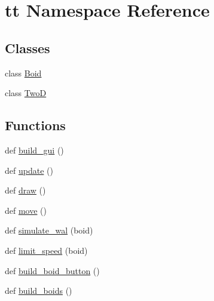 \hypertarget{namespacett}{}\section{tt Namespace Reference}
\label{namespacett}
\subsection*{Classes}
\begin{DoxyCompactItemize}
\item 
class \hyperlink{classtt_1_1_boid}{Boid}
\item 
class \hyperlink{classtt_1_1_two_d}{TwoD}
\end{DoxyCompactItemize}
\subsection*{Functions}
\begin{DoxyCompactItemize}
\item 
def \hyperlink{namespacett_a4d08caf13001a675cd82fe7c4438d657}{build\+\_\+gui} ()
\item 
def \hyperlink{namespacett_a7bdfd42cb1d13da52111a5be9b2d255b}{update} ()
\item 
def \hyperlink{namespacett_aa69d28bb0985169625e0b9162f4b1282}{draw} ()
\item 
def \hyperlink{namespacett_a958094ad0575c8ccce295d919f0a52ff}{move} ()
\item 
def \hyperlink{namespacett_a67daab86030bfe298b96882772167b9d}{simulate\+\_\+wal} (boid)
\item 
def \hyperlink{namespacett_afc13ee1aa227adfb8fe4d57a0237ab6a}{limit\+\_\+speed} (boid)
\item 
def \hyperlink{namespacett_a78b2b453f72a7691f0d677d157f53378}{build\+\_\+boid\+\_\+button} ()
\item 
def \hyperlink{namespacett_a50a93c829314fc1463e7cce7f8af6ae3}{build\+\_\+boids} ()
\end{DoxyCompactItemize}
